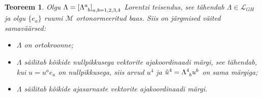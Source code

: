 \documentclass[a4paper,12pt]{article}
\theoremstyle{plain}
\newtheorem{teoreem}{Teoreem}[section]
\theoremstyle{definition}
\numberwithin{equation}{section}
\begin{document}
\begin{teoreem}\textnormal{\cite[teoreem 1.3.3]{Naber}}
Olgu $\Lambda = \left[\Lambda\indices{^a_b}\right]_{a,b = 1,2,3,4}$ Lorentzi teisendus, see tähendab $\Lambda \in \mathcal{L}_{GH}$ ja olgu $\{e_a\}$ ruumi $\mathcal{M}$ orto\-normeeritud baas. Siis on järgmised väited samaväärsed:
\begin{itemize}
\item[(i)] $\Lambda$ on ortokroonne;
\item[(ii)] $\Lambda$ säilitab kõikide nullpikkusega vektorite ajakoordinaadi märgi, see tähendab, kui $u = u^a e_a$ on nullpikkusega, siis arvud $u^4$ ja $\hat{u}^4 = \Lambda\indices{^4_b} u^b$ on sama märgiga;
\item[(iii)] $\Lambda$ säilitab kõikide ajasarnaste vektorite ajakoordinaadi märgi.
\end{itemize}
\end{teoreem}
\end{document}
